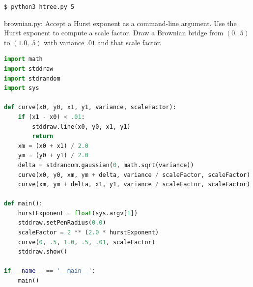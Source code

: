\documentclass[8pt,a4paper,compress]{beamer}
\begin{document}
\begin{frame}[fragile]
\begin{minipage}{160pt}
\begin{lstlisting}[language={},style=focusin]
$ python3 htree.py 5
\end{lstlisting}
\end{minipage}%
\begin{minipage}{140pt}
\hfill {}
\end{minipage}
\end{frame}

\begin{frame}[fragile]
\pause

\begin{framed}
\tiny brownian.py: Accept a Hurst exponent as a command-line argument. Use the Hurst exponent to compute a scale factor. Draw a Brownian bridge from $(0, .5)$ to $(1.0, .5)$ with variance $.01$ and that scale factor.
\end{framed}

\begin{lstlisting}[language=Python,style=focusin]
import math
import stddraw
import stdrandom
import sys

def curve(x0, y0, x1, y1, variance, scaleFactor):
    if (x1 - x0) < .01:
        stddraw.line(x0, y0, x1, y1)
        return
    xm = (x0 + x1) / 2.0
    ym = (y0 + y1) / 2.0
    delta = stdrandom.gaussian(0, math.sqrt(variance))
    curve(x0, y0, xm, ym + delta, variance / scaleFactor, scaleFactor)
    curve(xm, ym + delta, x1, y1, variance / scaleFactor, scaleFactor)

def main():
    hurstExponent = float(sys.argv[1])
    stddraw.setPenRadius(0.0)
    scaleFactor = 2 ** (2.0 * hurstExponent)
    curve(0, .5, 1.0, .5, .01, scaleFactor)
    stddraw.show()

if __name__ == '__main__':
    main()
\end{lstlisting}
\end{frame}
\end{document}
